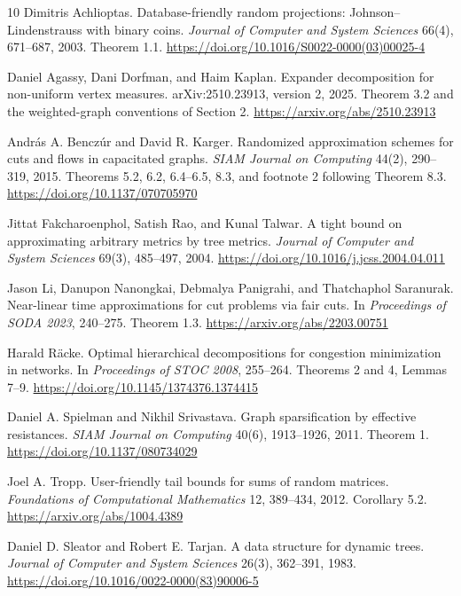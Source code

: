\documentclass[11pt]{article}
\theoremstyle{definition}
\begin{document}
\begin{thebibliography}{10}
\small
{}
Dimitris Achlioptas.
Database-friendly random projections: Johnson--Lindenstrauss with binary coins.
\emph{Journal of Computer and System Sciences} 66(4), 671--687, 2003.
Theorem 1.1.
\url{https://doi.org/10.1016/S0022-0000(03)00025-4}

Daniel Agassy, Dani Dorfman, and Haim Kaplan.
Expander decomposition for non-uniform vertex measures.
arXiv:2510.23913, version 2, 2025.
Theorem 3.2 and the weighted-graph conventions of Section 2.
\url{https://arxiv.org/abs/2510.23913}

Andr\'as A. Bencz\'ur and David R. Karger.
Randomized approximation schemes for cuts and flows in capacitated graphs.
\emph{SIAM Journal on Computing} 44(2), 290--319, 2015.
Theorems 5.2, 6.2, 6.4--6.5, 8.3, and footnote 2 following Theorem 8.3.
\url{https://doi.org/10.1137/070705970}

Jittat Fakcharoenphol, Satish Rao, and Kunal Talwar.
A tight bound on approximating arbitrary metrics by tree metrics.
\emph{Journal of Computer and System Sciences} 69(3), 485--497, 2004.
\url{https://doi.org/10.1016/j.jcss.2004.04.011}

Jason Li, Danupon Nanongkai, Debmalya Panigrahi, and Thatchaphol Saranurak.
Near-linear time approximations for cut problems via fair cuts.
In \emph{Proceedings of SODA 2023}, 240--275.
Theorem 1.3.
\url{https://arxiv.org/abs/2203.00751}

Harald R\"acke.
Optimal hierarchical decompositions for congestion minimization in networks.
In \emph{Proceedings of STOC 2008}, 255--264.
Theorems 2 and 4, Lemmas 7--9.
\url{https://doi.org/10.1145/1374376.1374415}

Daniel A. Spielman and Nikhil Srivastava.
Graph sparsification by effective resistances.
\emph{SIAM Journal on Computing} 40(6), 1913--1926, 2011.
Theorem 1.
\url{https://doi.org/10.1137/080734029}

Joel A. Tropp.
User-friendly tail bounds for sums of random matrices.
\emph{Foundations of Computational Mathematics} 12, 389--434, 2012.
Corollary 5.2.
\url{https://arxiv.org/abs/1004.4389}

Daniel D. Sleator and Robert E. Tarjan.
A data structure for dynamic trees.
\emph{Journal of Computer and System Sciences} 26(3), 362--391, 1983.
\url{https://doi.org/10.1016/0022-0000(83)90006-5}
\end{thebibliography}
\end{document}
